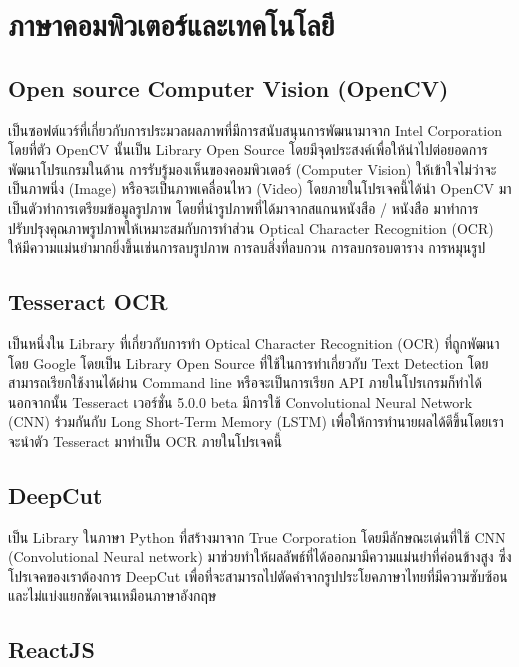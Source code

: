 \section{ภาษาคอมพิวเตอร์และเทคโนโลยี }

\subsection{Open source Computer Vision (OpenCV)}

เป็นซอฟต์แวร์ที่เกี่ยวกับการประมวลผลภาพที่มีการสนับสนุนการพัฒนามาจาก Intel Corporation โดยที่ตัว OpenCV นั้นเป็น Library Open Source  โดยมีจุดประสงค์เพื่อให้นำไปต่อยอดการพัฒนาโปรแกรมในด้าน การรับรู้มองเห็นของคอมพิวเตอร์ (Computer Vision) ให้เข้าใจไม่ว่าจะเป็นภาพนิ่ง (Image) หรือจะเป็นภาพเคลื่อนไหว (Video) โดยภายในโปรเจคนี้ได้นำ OpenCV มาเป็นตัวทำการเตรียมข้อมูลรูปภาพ โดยที่นำรูปภาพที่ได้มาจากสแกนหนังสือ / หนังสือ มาทำการปรับปรุงคุณภาพรูปภาพให้เหมาะสมกับการทำส่วน Optical Character Recognition (OCR) ให้มีความแม่นยำมากยิ่งขึ้นเช่นการลบรูปภาพ การลบสิ่งที่ลบกวน การลบกรอบตาราง การหมุนรูป 

\subsection{Tesseract OCR}

เป็นหนึ่งใน Library ที่เกี่ยวกับการทำ Optical Character Recognition (OCR) ที่ถูกพัฒนาโดย Google โดยเป็น Library Open Source ที่ใช้ในการทำเกี่ยวกับ Text Detection โดยสามารถเรียกใช้งานได้ผ่าน Command line หรือจะเป็นการเรียก API ภายในโปรเกรมก็ทำได้นอกจากนั้น Tesseract เวอร์ชั่น 5.0.0 beta มีการใช้ Convolutional Neural Network (CNN) \cite{keiron} ร่วมกันกับ Long Short-Term Memory (LSTM) เพื่อให้การทำนายผลได้ดีขึ้นโดยเราจะนำตัว Tesseract มาทำเป็น OCR ภายในโปรเจคนี้

\subsection{DeepCut}

เป็น Library ในภาษา Python ที่สร้างมาจาก True Corporation โดยมีลักษณะเด่นที่ใช้ CNN (Convolutional Neural network) \cite{keiron} มาช่วยทำให้ผลลัพธ์ที่ได้ออกมามีความแม่นยำที่ค่อนข้างสูง  ซึ่งโปรเจคของเราต้องการ DeepCut เพื่อที่จะสามารถไปตัดคำจากรูปประโยคภาษาไทยที่มีความซับซ้อน และไม่แบ่งแยกชัดเจนเหมือนภาษาอังกฤษ 

\subsection{ReactJS}

